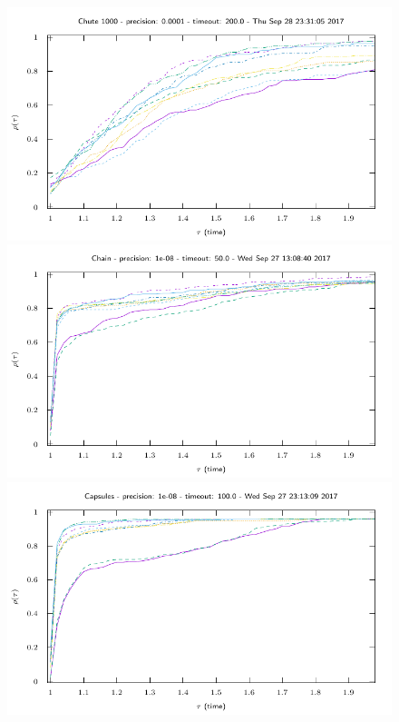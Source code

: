 \begin{figure}
\includegraphics[width=\figwidth]{../figure/NSGS/LocalTol/1.0e-04/200/time/profile-Chute_1000.pdf} 
\includegraphics[width=\figwidth]{../figure/NSGS/LocalTol/1.0e-08/50/time/profile-Chain.pdf} 
\includegraphics[width=\figwidth]{../figure/NSGS/LocalTol/1.0e-08/100/time/profile-Capsules.pdf} 

\end{figure}
